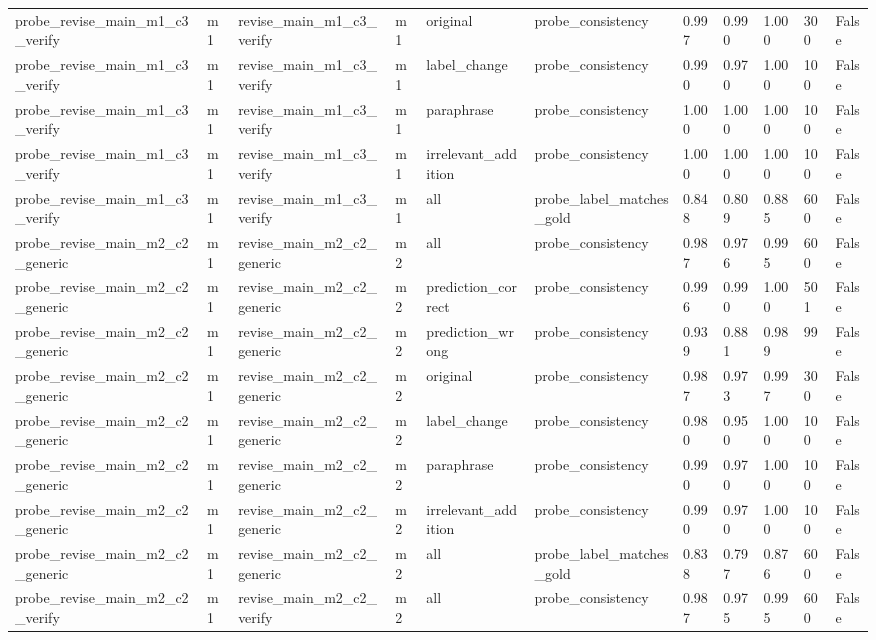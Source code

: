 \begin{tabular}{lllllllllll}
probe\_revise\_main\_m1\_c3\_verify & m1 & revise\_main\_m1\_c3\_verify & m1 & original & probe\_consistency & 0.997 & 0.990 & 1.000 & 300 & False \\
probe\_revise\_main\_m1\_c3\_verify & m1 & revise\_main\_m1\_c3\_verify & m1 & label\_change & probe\_consistency & 0.990 & 0.970 & 1.000 & 100 & False \\
probe\_revise\_main\_m1\_c3\_verify & m1 & revise\_main\_m1\_c3\_verify & m1 & paraphrase & probe\_consistency & 1.000 & 1.000 & 1.000 & 100 & False \\
probe\_revise\_main\_m1\_c3\_verify & m1 & revise\_main\_m1\_c3\_verify & m1 & irrelevant\_addition & probe\_consistency & 1.000 & 1.000 & 1.000 & 100 & False \\
probe\_revise\_main\_m1\_c3\_verify & m1 & revise\_main\_m1\_c3\_verify & m1 & all & probe\_label\_matches\_gold & 0.848 & 0.809 & 0.885 & 600 & False \\
probe\_revise\_main\_m2\_c2\_generic & m1 & revise\_main\_m2\_c2\_generic & m2 & all & probe\_consistency & 0.987 & 0.976 & 0.995 & 600 & False \\
probe\_revise\_main\_m2\_c2\_generic & m1 & revise\_main\_m2\_c2\_generic & m2 & prediction\_correct & probe\_consistency & 0.996 & 0.990 & 1.000 & 501 & False \\
probe\_revise\_main\_m2\_c2\_generic & m1 & revise\_main\_m2\_c2\_generic & m2 & prediction\_wrong & probe\_consistency & 0.939 & 0.881 & 0.989 & 99 & False \\
probe\_revise\_main\_m2\_c2\_generic & m1 & revise\_main\_m2\_c2\_generic & m2 & original & probe\_consistency & 0.987 & 0.973 & 0.997 & 300 & False \\
probe\_revise\_main\_m2\_c2\_generic & m1 & revise\_main\_m2\_c2\_generic & m2 & label\_change & probe\_consistency & 0.980 & 0.950 & 1.000 & 100 & False \\
probe\_revise\_main\_m2\_c2\_generic & m1 & revise\_main\_m2\_c2\_generic & m2 & paraphrase & probe\_consistency & 0.990 & 0.970 & 1.000 & 100 & False \\
probe\_revise\_main\_m2\_c2\_generic & m1 & revise\_main\_m2\_c2\_generic & m2 & irrelevant\_addition & probe\_consistency & 0.990 & 0.970 & 1.000 & 100 & False \\
probe\_revise\_main\_m2\_c2\_generic & m1 & revise\_main\_m2\_c2\_generic & m2 & all & probe\_label\_matches\_gold & 0.838 & 0.797 & 0.876 & 600 & False \\
probe\_revise\_main\_m2\_c2\_verify & m1 & revise\_main\_m2\_c2\_verify & m2 & all & probe\_consistency & 0.987 & 0.975 & 0.995 & 600 & False \\

\end{tabular}
